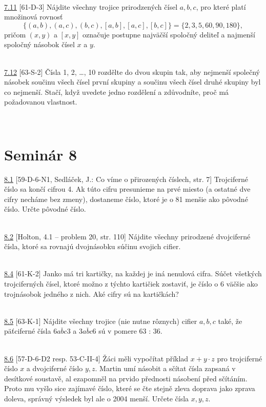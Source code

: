 \\

\noindent \ul{7.11} [61-D-3]
Nájdite všechny trojice prirodzených čísel $a, b, c$, pro které platí množinová rovnosť
$$\{(a, b), (a, c), (b, c), [a, b], [a, c], [b, c]\}= \{2, 3, 5, 60, 90, 180\},$$
pričom $(x, y)$ a $[x, y]$ označuje postupne najväčší spoločný deliteľ a najmenší spoločný násobok čísel $x$ a $y$.


\\

\noindent \ul{7.12} [63-S-2] Čísla 1, 2, \ldots , 10 rozdělte do dvou skupin
tak, aby nejmenší společný násobek součinu všech čísel první skupiny a součinu
všech čísel druhé skupiny byl co nejmenší. Stačí, když uvedete jedno rozdělení a
zdůvodníte, proč má požadovanou vlastnost.


\\

\section*{Seminár 8}

\noindent \ul{8.1} [59-D-6-N1, Sedláček, J.: Co víme o přirozených číslech, str. 7] Trojciferné číslo sa končí cifrou 4. Ak túto cifru presunieme na prvé miesto (a ostatné dve cifry necháme bez zmeny), dostaneme číslo, ktoré je o 81 menšie ako pôvodné číslo. Určte pôvodné číslo.


\\

\noindent \ul{8.2} [Holton, 4.1 -- problem 20, str. 110] Nájdite všechny prirodzené dvojciferné čísla, ktoré sa rovnajú dvojnásobku súčinu svojich cifier.


\\

\noindent \ul{8.4} [61-K-2] Janko má tri kartičky, na každej je iná nenulová cifra. Súčet všetkých trojciferných čísel, ktoré možno z týchto kartičiek zostaviť, je číslo o 6 väčšie ako trojnásobok jedného z nich. Aké cifry sú na kartičkách?


\\

\noindent \ul{8.5} [63-K-1]
Nájdite všechny trojice (nie nutne rôznych) cifier $a, b, c$ také, že päťciferné čísla $\overline{6abc3}$ a $\overline{3abc6}$ sú v pomere 63 : 36.


\\

\noindent \ul{8.6} [57-D-6-D2 resp. 53-C-II-4]  Žáci měli vypočítat příklad $x + y \cdot z$ pro
trojciferné číslo $x$ a dvojciferné číslo $y, z$. Martin umí násobit a sčítat čísla zapsaná v
desítkové soustavě, al ezapomněl na prvido přednosti násobení před sčítáním. Proto mu vyšlo sice
zajímavé číslo, které se čte stejně zleva doprava jako zprava doleva, správný výsledek byl ale o
2004 menší. Určete čísla $x, y, z$.


